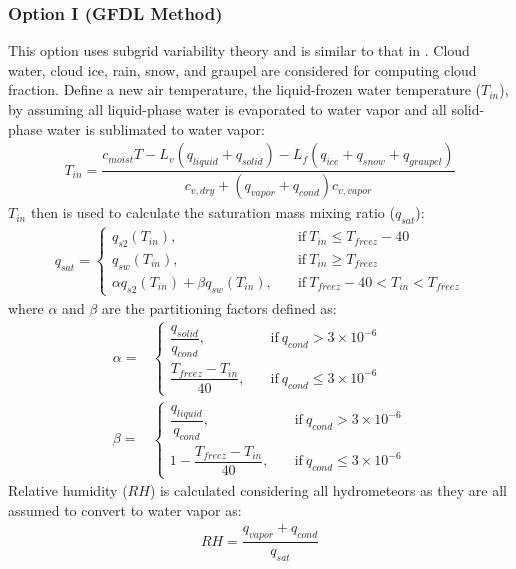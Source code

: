 \documentclass[letterpaper,titlepage,10pt]{article}
\numberwithin{equation}{section}
\begin{document}
\subsubsection*{Option I (GFDL Method)}

This option uses subgrid variability theory and is similar to that in \citet{letrent1991sens}. Cloud water, cloud ice, rain, snow, and graupel are considered for computing cloud fraction. Define a new air temperature, the liquid-frozen water temperature ($T_{in}$), by assuming all liquid-phase water is evaporated to water vapor and all solid-phase water is sublimated to water vapor:
\begin{gather}
	T_{in} = \dfrac{c_{moist} T - L_v \left(q_{liquid} + q_{solid} \right) - L_f \left(q_{ice} + q_{snow} + q_{graupel} \right)}{c_{v,dry} + \left(q_{vapor} + q_{cond} \right) c_{v,vapor}}
\end{gather}
$T_{in}$ then is used to calculate the saturation mass mixing ratio ($q_{sat}$):
\begin{align}
	q_{sat} =
	\begin{cases}
		q_{s2}(T_{in}), & \quad \text{if} \ T_{in} \leq T_{freez} - 40 \\
		q_{sw}(T_{in}), & \quad \text{if} \ T_{in} \geq T_{freez} \\
		\alpha q_{s2}(T_{in}) + \beta q_{sw}(T_{in}), & \quad \text{if} \ T_{freez} - 40 < T_{in} < T_{freez}	\end{cases}
\end{align}
where $\alpha$ and $\beta$ are the partitioning factors defined as:
\begin{align}
	\alpha =&
	\begin{cases}
		\dfrac{q_{solid}}{q_{cond}}, & \quad \text{if} \ q_{cond} > 3 \times 10^{-6} \\[1em]
		\dfrac{T_{freez} - T_{in}}{40}, & \quad \text{if} \ q_{cond} \leq 3 \times 10^{-6}
	\end{cases} \\
	\beta =&
	\begin{cases}
		\dfrac{q_{liquid}}{q_{cond}}, & \quad \text{if} \ q_{cond} > 3 \times 10^{-6} \\[1em]
		1 - \dfrac{T_{freez} - T_{in}}{40}, & \quad \text{if} \ q_{cond} \leq 3 \times 10^{-6}
	\end{cases}
\end{align}
Relative humidity ($RH$) is calculated considering all hydrometeors as they are all assumed to convert to water vapor as:
\begin{gather}
	RH = \dfrac{q_{vapor} + q_{cond}}{q_{sat}}
\end{gather}
\end{document}
